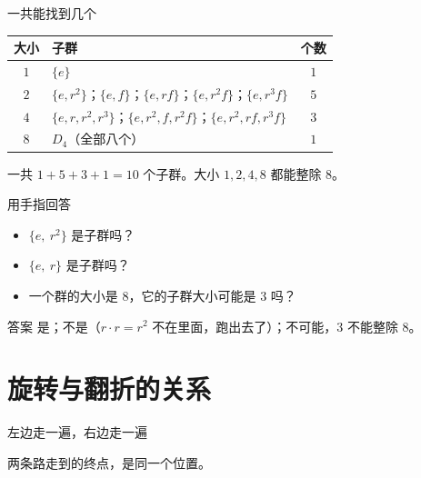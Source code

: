 \documentclass[10pt]{beamer}
\begin{document}
\begin{frame}{一共能找到几个}
  \begin{center}
  \begin{tabular}{@{}clc@{}}
    \toprule
    大小 & 子群 & 个数 \\
    \midrule
    \(1\) & \(\{e\}\) & \(1\) \\
    \(2\) & \(\{e,r^2\}\)；\(\{e,f\}\)；\(\{e,rf\}\)；\(\{e,r^2f\}\)；\(\{e,r^3f\}\) & \(5\) \\
    \(4\) & \(\{e,r,r^2,r^3\}\)；\(\{e,r^2,f,r^2f\}\)；\(\{e,r^2,rf,r^3f\}\) & \(3\) \\
    \(8\) & \(D_4\)（全部八个） & \(1\) \\
    \bottomrule
  \end{tabular}
  \end{center}
  \pause
  \begin{center}
    {\large 一共 \(1+5+3+1=10\) 个子群。\quad 大小 \(1,2,4,8\) 都能整除 \(8\)。}
  \end{center}
\end{frame}

\begin{frame}{用手指回答}
  \begin{itemize}
    \item \(\{e,\ r^2\}\) 是子群吗？
    \item \(\{e,\ r\}\) 是子群吗？
    \item 一个群的大小是 \(8\)，它的子群大小可能是 \(3\) 吗？
  \end{itemize}
  \pause
  \begin{block}{答案}
    是；\quad 不是（\(r\cdot r=r^2\) 不在里面，跑出去了）；\quad 不可能，\(3\) 不能整除 \(8\)。
  \end{block}
\end{frame}

\section{旋转与翻折的关系}

\begin{frame}{左边走一遍，右边走一遍}
  \pause
  \begin{center}
    两条路走到的终点，是同一个位置。
  \end{center}
\end{frame}
\end{document}
